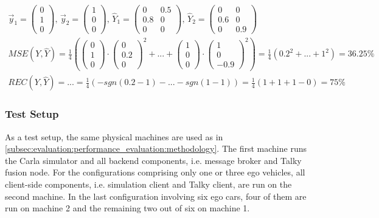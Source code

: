 \begin{gather*}
	\vec{y}_1 = \begin{pmatrix}0 \\ 1 \\ 0 \end{pmatrix} \text{,\ } \vec{y}_2 = \begin{pmatrix}1 \\ 0 \\ 0 \end{pmatrix} \text{,\ }
	\hat{Y}_1 = \begin{pmatrix}
	0 & 0.5 \\
	0.8 & 0 \\
	0 & 0
	\end{pmatrix} \text{,\ }
	\hat{Y}_2 = \begin{pmatrix}
	0 & 0 \\
	0.6 & 0 \\
	0 & 0.9
	\end{pmatrix} \\
	\textit{MSE}(Y, \hat{Y}) = \frac{1}{4} (\begin{pmatrix}0 \\ 1 \\ 0 \end{pmatrix} \cdot \begin{pmatrix}0 \\ 0.2 \\ 0 \end{pmatrix}^2 + \text{...} + \begin{pmatrix}1 \\ 0 \\ 0 \end{pmatrix} \cdot \begin{pmatrix}1 \\ 0 \\ -0.9 \end{pmatrix}^2) = \frac{1}{4} (0.2^2 + \text{...} + 1^2) = 36.25 \% \\
	\textit{REC}(Y, \hat{Y}) = \text{...} = \frac{1}{4} (-\textit{sgn}(0.2-1) - \text{...} -\textit{sgn}(1-1)) = \frac{1}{4} (1+1+1-0) = 75 \%
\end{gather*}

\subsubsection{Test Setup}
As a test setup, the same physical machines are used as in \cref{subsec:evaluation:performance_evaluation:methodology}. The first machine runs the Carla simulator and all backend components, i.e. message broker and Talky fusion node. For the configurations comprising only one or three ego vehicles, all client-side components, i.e. simulation client and Talky client, are run on the second machine. In the last configuration involving six ego cars, four of them are run on machine 2 and the remaining two out of six on machine 1.

